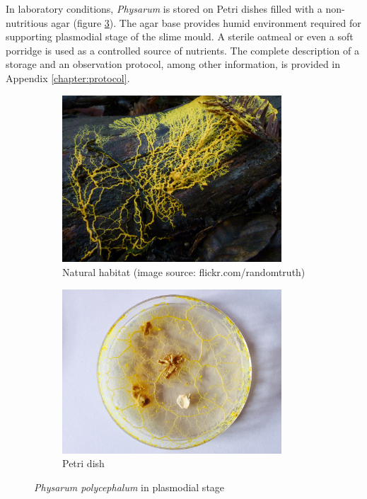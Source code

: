 \documentclass[english,a4paper,twoside]{ppfcmthesis}
\begin{document}
In laboratory conditions, \textit{Physarum} is stored on Petri dishes filled with a non-nutritious agar (figure \ref{figure:bp_petri}). The agar base provides humid environment required for supporting plasmodial stage of the slime mould. A sterile oatmeal or even a soft porridge is used as a controlled source of nutrients. The complete description of a storage and an observation protocol, among other information, is provided in Appendix \ref{chapter:protocol}.

\begin{figure}
  \centering
  \begin{subfigure}{0.45\textwidth}
    \centering
    \includegraphics[width=0.9\textwidth]{background/physarum/habitat.jpg}
    \caption{Natural habitat (image source: flickr.com/randomtruth)}
    \label{figure:bp_habitat}
  \end{subfigure}
  \begin{subfigure}{0.45\textwidth}
    \centering
    \includegraphics[width=0.9\textwidth]{physarum/IMG_1194.jpg}
    \caption{Petri dish}
    \label{figure:bp_petri}
  \end{subfigure}
  \caption{\textit{Physarum polycephalum} in plasmodial stage}
\end{figure}
\end{document}
